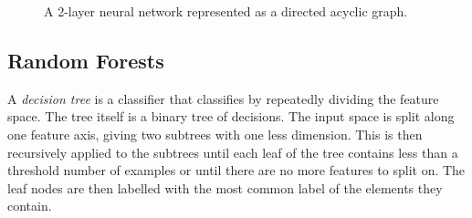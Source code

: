         \begin{figure}
            \centering
            \caption{A 2-layer neural network represented as a directed acyclic
                graph.}
            \label{fig:nn-as-dag}
        \end{figure}

    \subsection{Random Forests}
    \label{sec:random-forests}

        A \emph{decision tree} is a classifier that classifies by repeatedly
        dividing the feature space. The tree itself is a binary tree of
        decisions. The input space is split along one feature axis, giving two
        subtrees with one less dimension. This is then recursively applied to
        the subtrees until each leaf of the tree contains less than a threshold
        number of examples or until there are no more features to split on. The
        leaf nodes are then labelled with the most common label of the elements
        they contain.

